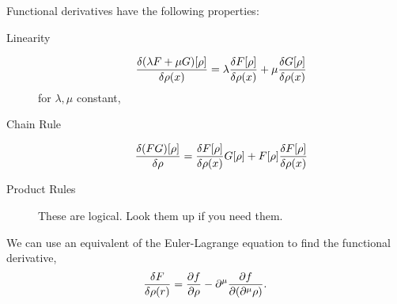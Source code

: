Functional derivatives have the following properties:
\begin{description}
  \item [Linearity] \[ \fdv{(\lambda F + \mu G)[\rho]}{\rho(x)} = \lambda \fdv{F[\rho]}{\rho(x)} + \mu \fdv{G[\rho]}{\rho(x)}\]
  for \(\lambda, \mu\) constant,
  \item [Chain Rule] \[ \fdv{(FG)[\rho]}{\rho} = \fdv{F[\rho]}{\rho(x)}G[\rho] + F[\rho]\fdv{F[\rho]}{\rho(x)} \]
  \item [Product Rules] These are logical. Look them up if you need them.
\end{description}

We can use an equivalent of the Euler-Lagrange equation to find the functional derivative, \[ \fdv{F}{\rho(r)} = \pdv{f}{\rho} - \partial^\mu \pdv{f}{\qty(\partial^\mu \rho)}.\]
